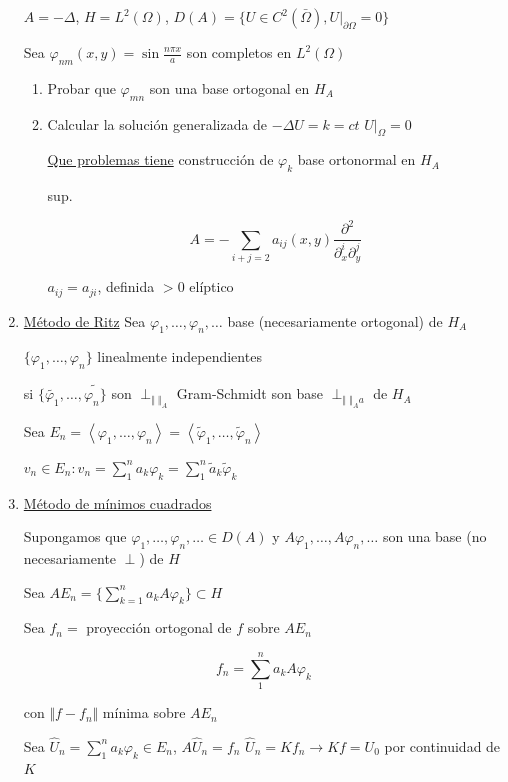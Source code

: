 \documentclass[a4paper,10pt]{book}
\begin{document}
\begin{enumerate}
$A=-\Delta$, $H= L^2(\Omega)$, $D(A)= \{ U\in C^2 (\bar{\Omega}) , U|_{\partial \Omega} =0 \}$

Sea $\varphi_{n m}(x,y) = \sin \frac  {n \pi x}{ a}$ son completos en $L^2(\Omega)$ 

\begin{enumerate}
    \item Probar que $\varphi_{mn}$ son una base ortogonal en $H_A$
    \item Calcular la solución generalizada  de $-\Delta U = k= ct $  $U|_{\Omega}=0$

    \underline{Que problemas tiene} construcción de $\varphi_k$ base ortonormal en $H_A$

    sup.

    \[
    A= -\sum_{ i+j=2} a_{ij}(x,y) \frac{\partial^2}{ \partial _x^i  \partial _y^j}
    \]

    $a_{ij} = a_{ji}$, definida $>0$ elíptico
\end{enumerate}

\item \underline{Método de Ritz} Sea $\varphi_1,\ldots,\varphi_n,\ldots$ base (necesariamente ortogonal) de $H_A$

$\{ \varphi_1,\ldots,\varphi_n\}$ linealmente independientes

si $\{ \tilde{\varphi_1},\ldots,\tilde{\varphi_n\}}$ son $\perp_{\Vert \;\Vert_A}$ Gram-Schmidt son base $\perp_{\Vert \;\Vert_Aa}$ de $H_A$

Sea $E_n=\left< \varphi_1,\ldots,\varphi_n \right> = \left< \tilde{\varphi}_1,\ldots,\tilde{\varphi}_n \right>$

$v_n \in E_n : v_n = \sum\limits_1^n a_k \varphi_k = \sum\limits_1^n \tilde{a}_k \tilde{\varphi}_k$

\item \underline{Método de mínimos cuadrados}

Supongamos que $\varphi_1,\ldots,\varphi_n,\ldots \in D(A)$ y $A\varphi_1,\ldots,A\varphi_n,\ldots$ son una base (no necesariamente $\perp$) de $H$ 

Sea $AE_n= \{  \sum\limits_{k=1}^n a_k A\varphi_k \} \subset H$

Sea $f_n=$ proyección ortogonal de $f$ sobre $AE_n$

\[
f_n =\sum\limits_1^n a_k A \varphi_k 
\]

con $\Vert f-f_n\Vert$ mínima sobre $A E_n $

Sea $\hat{U}_n = \sum\limits_1^n a_k \varphi_k \in E_n$,  $A\hat{U}_n = f_n $
$\hat{ U}_n = K f_n \rightarrow Kf = U_0$ por continuidad de $K$


\end{enumerate}
\end{document}
